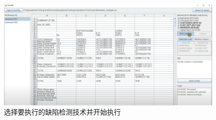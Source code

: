 \begin{figure}[tbp]    
    \centering
    \includegraphics[width=\textwidth]{figure/sg/sguard-4.png}
    \caption{选择要执行的缺陷检测技术并开始执行}
    \label{figure-sg4}
\end{figure}